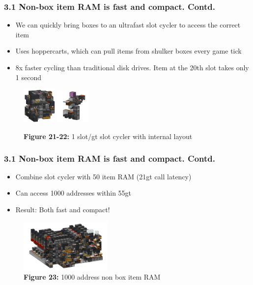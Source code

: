 \documentclass[aspectratio=169]{beamer}
\begin{document}
\begin{frame}
	\frametitle{3.1 Non-box item RAM is fast and compact. Contd.}

    \begin{itemize}
		\item We can quickly bring boxes to an ultrafast slot cycler to access the correct item
		\item Uses hoppercarts, which can pull items from shulker boxes every game tick
        \item 8x faster cycling than traditional disk drives. Item at the 20th slot takes only 1 second
	\end{itemize}
    \begin{figure}
        \includegraphics[width=0.15\textwidth]{slotiter.png}
        \includegraphics[width=0.15\textwidth]{slotintern.png}
        \caption{\textbf{Figure 21-22:} 1 slot/gt slot cycler with internal layout}
    \end{figure}
\end{frame}


\begin{frame}
	\frametitle{3.1 Non-box item RAM is fast and compact. Contd.}

    \begin{itemize}
		\item Combine slot cycler with 50 item RAM (21gt call latency)
		\item Can access 1000 addresses within 55gt
		\item Result: Both fast and compact!
	\end{itemize}
    \begin{figure}
        \includegraphics[width=0.4\textwidth]{nonbox.png}
        \caption{\textbf{Figure 23:} 1000 address non box item RAM}
    \end{figure}
\end{frame}
\end{document}
